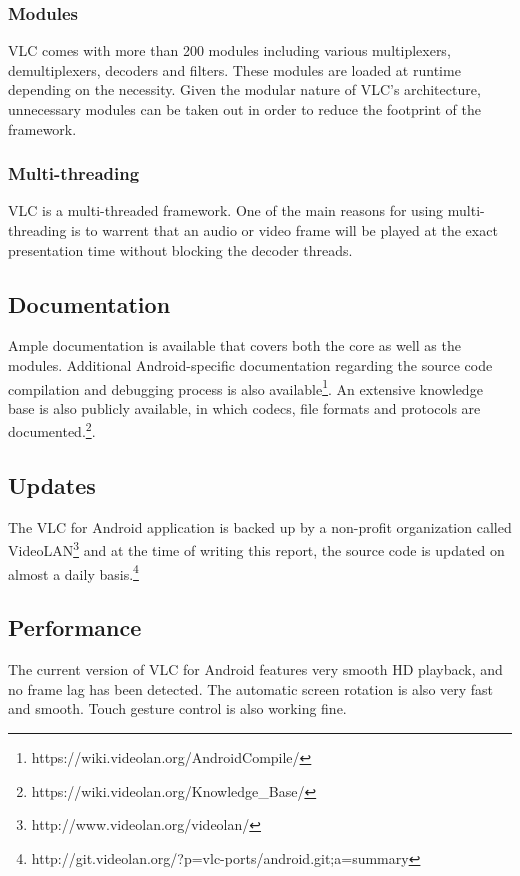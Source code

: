 \subsubsection{Modules}
VLC comes with more than 200 modules including various multiplexers, demultiplexers, decoders and filters. These modules are loaded at runtime depending on the necessity. Given the modular nature of VLC's architecture, unnecessary modules can be taken out in order to reduce the footprint of the framework.
\subsubsection{Multi-threading}
VLC is a multi-threaded framework. One of the main reasons for using multi-threading is to warrent that an audio or video frame will be played at the exact presentation time without blocking the decoder threads.
\subsection{Documentation}
Ample documentation is available that covers both the core as well as the modules. Additional Android-specific documentation regarding the source code compilation and debugging process is also available\footnote{https://wiki.videolan.org/AndroidCompile/}. An extensive knowledge base is also publicly available, in which codecs, file formats and protocols are documented.\footnote{https://wiki.videolan.org/Knowledge\_Base/}.
\subsection{Updates}
The VLC for Android application is backed up by a non-profit organization called VideoLAN\footnote{http://www.videolan.org/videolan/} and at the time of writing this report, the source code is updated on almost a daily basis.\footnote{http://git.videolan.org/?p=vlc-ports/android.git;a=summary}
\subsection{Performance}
The current version of VLC for Android features very smooth HD playback, and no frame lag has been detected. The automatic screen rotation is also very fast and smooth. Touch gesture control is also working fine.



